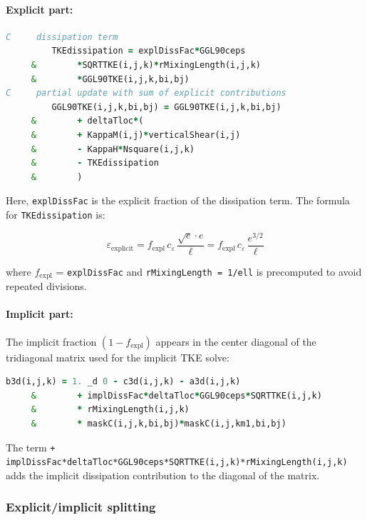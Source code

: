 \documentclass[12pt,letterpaper]{article}
\begin{document}
\paragraph{Explicit part:}

\begin{lstlisting}[language=Fortran,caption={(ggl90\_calc.F:L600--610) Explicit dissipation term}]
C     dissipation term
         TKEdissipation = explDissFac*GGL90ceps
     &        *SQRTTKE(i,j,k)*rMixingLength(i,j,k)
     &        *GGL90TKE(i,j,k,bi,bj)
C     partial update with sum of explicit contributions
         GGL90TKE(i,j,k,bi,bj) = GGL90TKE(i,j,k,bi,bj)
     &        + deltaTloc*(
     &        + KappaM(i,j)*verticalShear(i,j)
     &        - KappaH*Nsquare(i,j,k)
     &        - TKEdissipation
     &        )
\end{lstlisting}

Here, \verb|explDissFac| is the explicit fraction of the dissipation term. The formula for \verb|TKEdissipation| is:

\begin{equation}
\varepsilon_{\text{explicit}} = f_{\text{expl}} \, c_\varepsilon \, \frac{\sqrt{e} \cdot e}{\ell} = f_{\text{expl}} \, c_\varepsilon \, \frac{e^{3/2}}{\ell}
\end{equation}

where $f_{\text{expl}}$ = \verb|explDissFac| and \verb|rMixingLength = 1/ell| is precomputed to avoid repeated divisions.

\paragraph{Implicit part:}

The implicit fraction $(1 - f_{\text{expl}})$ appears in the center diagonal of the tridiagonal matrix used for the implicit TKE solve:

\begin{lstlisting}[language=Fortran,caption={(ggl90\_calc.F:L746--749) Implicit dissipation in matrix diagonal}]
         b3d(i,j,k) = 1. _d 0 - c3d(i,j,k) - a3d(i,j,k)
     &        + implDissFac*deltaTloc*GGL90ceps*SQRTTKE(i,j,k)
     &        * rMixingLength(i,j,k)
     &        * maskC(i,j,k,bi,bj)*maskC(i,j,km1,bi,bj)
\end{lstlisting}

The term \verb|+ implDissFac*deltaTloc*GGL90ceps*SQRTTKE(i,j,k)*rMixingLength(i,j,k)| adds the implicit dissipation contribution to the diagonal of the matrix.

\subsubsection{Explicit/implicit splitting}
\end{document}
